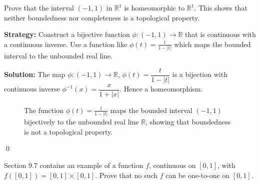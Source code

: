 \begin{problembox}
\begin{problemstatement}
Prove that the interval $(-1, 1)$ in $\mathbb{R}^1$ is homeomorphic to $\mathbb{R}^1$. This shows that neither boundedness nor completeness is a topological property.
\end{problemstatement}
\end{problembox}

\noindent\textbf{Strategy:} Construct a bijective function $\phi: (-1,1) \to \mathbb{R}$ that is continuous with a continuous inverse. Use a function like $\phi(t) = \frac{t}{1-|t|}$ which maps the bounded interval to the unbounded real line.

\bigskip\noindent\textbf{Solution:}
The map $\phi:(-1,1)\to\mathbb{R}$, $\phi(t)=\dfrac{t}{1-|t|}$ is a bijection with continuous inverse $\phi^{-1}(x)=\dfrac{x}{1+|x|}$. Hence a homeomorphism.

\begin{figure}[h]
\centering
{}
\caption{The function $\phi(t) = \frac{t}{1-|t|}$ maps the bounded interval $(-1,1)$ bijectively to the unbounded real line $\mathbb{R}$, showing that boundedness is not a topological property.}
\end{figure}\qed



\begin{problembox}
\begin{problemstatement}
Section 9.7 contains an example of a function $f$, continuous on $[0, 1]$, with $f([0, 1]) = [0, 1] \times [0, 1]$. Prove that no such $f$ can be one-to-one on $[0, 1]$.
\end{problemstatement}
\end{problembox}

